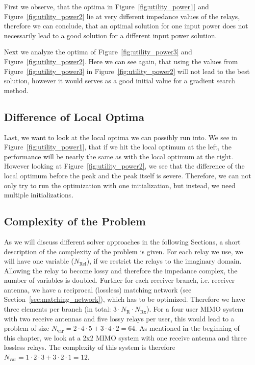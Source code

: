 First we observe, that the optima in Figure~\ref{fig:utility_power1} and Figure~\ref{fig:utility_power2} lie at very different impedance values of the relays, therefore we can conclude, that an optimal solution for one input power does not necessarily lead to a good solution for a different input power solution.

Next we analyze the optima of Figure~\ref{fig:utility_power3} and Figure~\ref{fig:utility_power2}.
Here we can see again, that using the values from Figure~\ref{fig:utility_power3} in Figure~\ref{fig:utility_power2} will not lead to the best solution, however it would serves as a good initial value for a gradient search method.


\subsection{Difference of Local Optima}
\label{sec:}

Last, we want to look at the local optima we can possibly run into.
We see in Figure~\ref{fig:utility_power1}, that if we hit the local optimum at the left, the performance will be nearly the same as with the local optimum at the right.
However looking at Figure~\ref{fig:utility_power2}, we see that the difference of the local optimum before the peak and the peak itself is severe.
Therefore, we can not only try to run the optimization with one initialization, but instead, we need multiple initializations.

\subsection{Complexity of the Problem}
\label{sec:}

As we will discuss different solver approaches in the following Sections, a short description of the complexity of the problem is given.
For each relay we use, we will have one variable ($N_\text{Rel}$), if we restrict the relays to the imaginary domain.
Allowing the relay to become lossy and therefore the impedance complex, the number of variables is doubled.%
Further for each receiver branch, i.e. receiver antenna, we have a reciprocal (lossless) matching network (see Section~\ref{sec:matching_network}), which has to be optimized.
Therefore we have three elements per branch (in total: $3\cdot N_\text{R}\cdot N_\text{Rx}$).
For a four user MIMO system with two receive antennas and five lossy relays per user, this would lead to a problem of size $N_\text{var} =  2\cdot 4\cdot 5 + 3\cdot 4\cdot 2 = 64$.
As mentioned in the beginning of this chapter, we look at a 2x2 MIMO system with one receive antenna and three lossless relays.
The complexity of this system is therefore $N_\text{var} =  1\cdot 2\cdot 3 + 3\cdot 2\cdot 1 = 12$.

